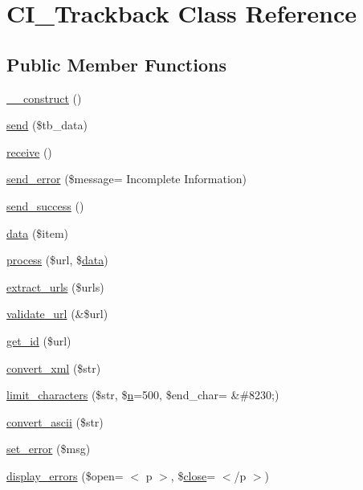 \hypertarget{class_c_i___trackback}{}\section{C\+I\+\_\+\+Trackback Class Reference}
\label{class_c_i___trackback}
\subsection*{Public Member Functions}
\begin{DoxyCompactItemize}
\item 
\hyperlink{class_c_i___trackback_a095c5d389db211932136b53f25f39685}{\+\_\+\+\_\+construct} ()
\item 
\hyperlink{class_c_i___trackback_a4ee54341ef16e67ca033704f4373a56b}{send} (\$tb\+\_\+data)
\item 
\hyperlink{class_c_i___trackback_ac805eb3a4eb25b19c1ab093023da4d35}{receive} ()
\item 
\hyperlink{class_c_i___trackback_a277bbe0de9722c8222b90c275f1a2e50}{send\+\_\+error} (\$message= \textquotesingle{}Incomplete Information\textquotesingle{})
\item 
\hyperlink{class_c_i___trackback_a57468453a4dc88340fdf12fb6e314248}{send\+\_\+success} ()
\item 
\hyperlink{class_c_i___trackback_a4d04a7a984a4bcc71e27be87706f393c}{data} (\$item)
\item 
\hyperlink{class_c_i___trackback_a7244ffd64e186d863812bb300fec8cdc}{process} (\$url, \$\hyperlink{class_c_i___trackback_a4d04a7a984a4bcc71e27be87706f393c}{data})
\item 
\hyperlink{class_c_i___trackback_aab29f333201544b83e318dd761ac797a}{extract\+\_\+urls} (\$urls)
\item 
\hyperlink{class_c_i___trackback_a5caa264fab6d2b2344e6bd5b298b08f2}{validate\+\_\+url} (\&\$url)
\item 
\hyperlink{class_c_i___trackback_a404e345e61e00d5685117a101b5bc71a}{get\+\_\+id} (\$url)
\item 
\hyperlink{class_c_i___trackback_a1ec67af2037561b65ffe49b59727cb53}{convert\+\_\+xml} (\$str)
\item 
\hyperlink{class_c_i___trackback_ae0ad829d77163bde82745af94068a6b7}{limit\+\_\+characters} (\$str, \$\hyperlink{cli_2error__general_8php_ace0fd03cd383f20ce6ea63247a207294}{n}=500, \$end\+\_\+char= \textquotesingle{}\&\#8230;\textquotesingle{})
\item 
\hyperlink{class_c_i___trackback_a0029bda7d34a222a5bda4ac894c31ac1}{convert\+\_\+ascii} (\$str)
\item 
\hyperlink{class_c_i___trackback_a892f1ba7cba3731a3fc68f1f64e92610}{set\+\_\+error} (\$msg)
\item 
\hyperlink{class_c_i___trackback_a3ed4aa1a4d480c82bb1b663efd466aee}{display\+\_\+errors} (\$open= \textquotesingle{}$<$ p $>$\textquotesingle{}, \$\hyperlink{assets_2js_2bootstrap_8min_8js_afaca3a961d693f40135a872e93e71198}{close}= \textquotesingle{}$<$/p $>$\textquotesingle{})
\end{DoxyCompactItemize}
